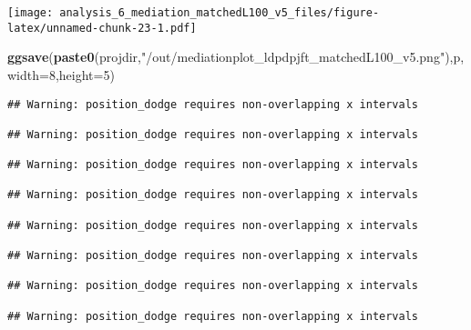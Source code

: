 \documentclass[
]{article}
\newenvironment{Shaded}{\begin{snugshade}}{\end{snugshade}}
\newcommand{\DataTypeTok}[1]{\textcolor[rgb]{0.13,0.29,0.53}{#1}}
\newcommand{\DecValTok}[1]{\textcolor[rgb]{0.00,0.00,0.81}{#1}}
\newcommand{\KeywordTok}[1]{\textcolor[rgb]{0.13,0.29,0.53}{\textbf{#1}}}
\newcommand{\NormalTok}[1]{#1}
\newcommand{\StringTok}[1]{\textcolor[rgb]{0.31,0.60,0.02}{#1}}
\begin{document}
\texttt{[image: analysis\_6\_mediation\_matchedL100\_v5\_files/figure-latex/unnamed-chunk-23-1.pdf]}

\begin{Shaded}
\begin{Highlighting}[]
\KeywordTok{ggsave}\NormalTok{(}\KeywordTok{paste0}\NormalTok{(projdir,}\StringTok{"/out/mediationplot_ldpdpjft_matchedL100_v5.png"}\NormalTok{),p,}\DataTypeTok{width=}\DecValTok{8}\NormalTok{,}\DataTypeTok{height=}\DecValTok{5}\NormalTok{)}
\end{Highlighting}
\end{Shaded}

\begin{verbatim}
## Warning: position_dodge requires non-overlapping x intervals

## Warning: position_dodge requires non-overlapping x intervals

## Warning: position_dodge requires non-overlapping x intervals

## Warning: position_dodge requires non-overlapping x intervals

## Warning: position_dodge requires non-overlapping x intervals

## Warning: position_dodge requires non-overlapping x intervals

## Warning: position_dodge requires non-overlapping x intervals

## Warning: position_dodge requires non-overlapping x intervals
\end{verbatim}
\end{document}
